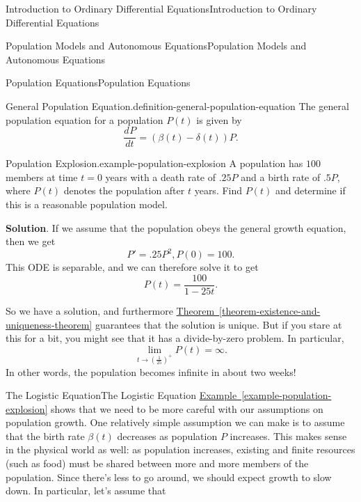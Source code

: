 \documentclass[10pt,]{book}
\numberwithin{equation}{section}
\newcommand{\dv}[3][]{\dfrac{d^{#1} #2}{d #3^{#1}}}
\begin{document}
\begin{chapterptx}{Introduction to Ordinary Differential Equations}{}{Introduction to Ordinary Differential Equations}{}{}
\begin{sectionptx}{Population Models and Autonomous Equations}{}{Population Models and Autonomous Equations}{}{}
\begin{subsectionptx}{Population Equations}{}{Population Equations}{}{}
\begin{definition}{General Population Equation.}{definition-general-population-equation}%
\hypertarget{p-107}{}%
The general population equation for a population \(P(t)\) is given by%
\begin{equation*}
\dv{P}{t} = (\beta(t) - \delta(t))P.
\end{equation*}
%
\end{definition}
\begin{example}{Population Explosion.}{example-population-explosion}%
\hypertarget{p-108}{}%
A population has \(100\) members at time \(t = 0\) years with a death rate of \(.25P\) and a birth rate of \(.5P\), where \(P(t)\) denotes the population after \(t\) years. Find \(P(t)\) and determine if this is a reasonable population model.%
\par\smallskip%
\noindent\textbf{Solution}.\hypertarget{solution-17}{}\quad%
\hypertarget{p-109}{}%
If we assume that the population obeys the general growth equation, then we get%
\begin{equation*}
P' = .25P^{2}, P(0) = 100.
\end{equation*}
This ODE is separable, and we can therefore solve it to get%
\begin{equation*}
P(t) = \frac{100}{1 - 25t}.
\end{equation*}
%
\par
\hypertarget{p-110}{}%
So we have a solution, and furthermore \hyperref[theorem-existence-and-uniqueness-theorem]{Theorem~\ref{theorem-existence-and-uniqueness-theorem}} guarantees that the solution is unique. But if you stare at this for a bit, you might see that it has a divide-by-zero problem. In particular,%
\begin{equation*}
\lim_{t\to(\frac{1}{25})^{+}}P(t) = \infty.
\end{equation*}
In other words, the population becomes infinite in about two weeks!%
\end{example}
\end{subsectionptx}
%
%
\typeout{************************************************}
\typeout{************************************************}
%
\begin{subsectionptx}{The Logistic Equation}{}{The Logistic Equation}{}{}\label{subsection-the-logistic-equation}
\hypertarget{p-111}{}%
\hyperref[example-population-explosion]{Example~\ref{example-population-explosion}} shows that we need to be more careful with our assumptions on population growth. One relatively simple assumption we can make is to assume that the birth rate \(\beta(t)\) decreases as population \(P\) increases. This makes sense in the physical world as well: as population increases, existing and finite resources (such as food) must be shared between more and more members of the population. Since there's less to go around, we should expect growth to slow down. In particular, let's assume that%

\end{subsectionptx}
\end{sectionptx}
\end{chapterptx}
\end{document}
